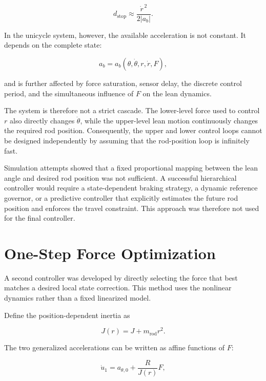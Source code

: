 \begin{equation}
d_{\mathrm{stop}}
\approx
\frac{\dot{r}^{\,2}}
     {2|a_b|}.
\label{eq:approximate-rod-stopping-distance}
\end{equation}

In the unicycle system, however, the available acceleration is not constant. It depends on the complete state:

\begin{equation}
a_b
=
a_b
\left(
\theta,\dot{\theta},r,\dot{r},F
\right),
\end{equation}

and is further affected by force saturation, sensor delay, the discrete control period, and the simultaneous influence of $F$ on the lean dynamics.

The system is therefore not a strict cascade. The lower-level force used to control $r$ also directly changes $\ddot{\theta}$, while the upper-level lean motion continuously changes the required rod position. Consequently, the upper and lower control loops cannot be designed independently by assuming that the rod-position loop is infinitely fast.

Simulation attempts showed that a fixed proportional mapping between the lean angle and desired rod position was not sufficient. A successful hierarchical controller would require a state-dependent braking strategy, a dynamic reference governor, or a predictive controller that explicitly estimates the future rod position and enforces the travel constraint. This approach was therefore not used for the final controller.

\section{One-Step Force Optimization}
\label{sec:one-step-force-optimization}

A second controller was developed by directly selecting the force that best matches a desired local state correction. This method uses the nonlinear dynamics rather than a fixed linearized model.

Define the position-dependent inertia as

\begin{equation}
J(r)=J+m_{\mathrm{rod}}r^2.
\end{equation}

The two generalized accelerations can be written as affine functions of $F$:

\begin{equation}
\dot{u}_1
=
a_{\theta,0}
+
\frac{R}{J(r)}F,
\label{eq:l2-angular-acceleration}
\end{equation}

